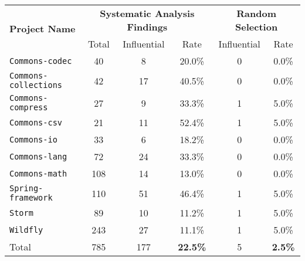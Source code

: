 \centering
\resizebox{0.8\linewidth}{!}
{
\begin{tabular}{l c c c | c c}
  \multirow{2}{*}{\bf Project Name} & 
  \multicolumn{3}{c|}{\bf Systematic Analysis Findings} & 
  \multicolumn{2}{c}{\bf Random Selection} \\
  & Total & Influential & Rate & Influential & Rate \\

\toprule

{\tt Commons-codec} & 40 & 8 & 20.0\% & 0 & 0.0\% \\
{\tt Commons-collections} & 42 & 17 & 40.5\% & 0 & 0.0\%\\
{\tt Commons-compress} & 27 & 9 & 33.3\% & 1 & 5.0\% \\
{\tt Commons-csv} & 21 & 11 & 52.4\% & 1 & 5.0\% \\
{\tt Commons-io} & 33 & 6 & 18.2\% & 0 & 0.0\%\\
{\tt Commons-lang} & 72 & 24 & 33.3\% &0 & 0.0\%\\
{\tt Commons-math} & 108 & 14 & 13.0\% & 0 & 0.0\%\\
{\tt Spring-framework} & 110 & 51 & 46.4\% & 1 & 5.0\%\\
{\tt Storm} & 89 & 10 & 11.2\% & 1 & 5.0\% \\
{\tt Wildfly} & 243 & 27 & 11.1\% & 1 & 5.0\% \\
\midrule
Total & 785 & 177 & {\bf 22.5\%} & 5 & {\bf 2.5\%}\\
\bottomrule

\end{tabular}}
